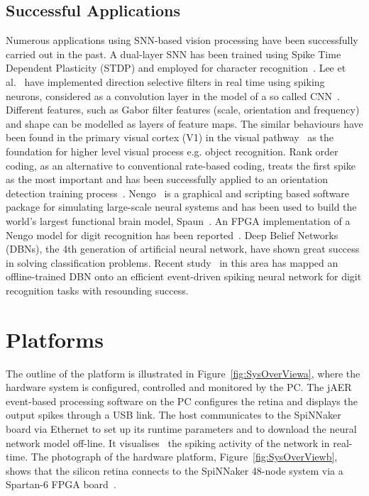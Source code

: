 \subsection{Successful Applications}
Numerous applications using SNN-based vision processing have been successfully carried out in the past. 
A dual-layer SNN has been trained using Spike Time Dependent Plasticity (STDP) and employed for character recognition~\cite{gupta2007character}. 
Lee et al.~\cite{6467270} have implemented direction selective filters in real time using spiking neurons, considered as a convolution layer in the model of a so called CNN~\cite{camunas2012event}. 
Different features, such as Gabor filter features (scale, orientation and frequency) and shape can be modelled as layers of feature maps. 
The similar behaviours have been found in the primary visual cortex (V1) in the visual pathway~\cite{rehn2007network} as the foundation for higher level visual process e.g. object recognition.
Rank order coding, as an alternative to conventional rate-based coding, treats the first spike as the most important and has been successfully applied to an orientation detection training process~\cite{delorme2001networks}. 
Nengo~\cite{eliasmith2011nengo} is a graphical and scripting based software package for simulating large-scale neural systems and has been used to build the world's largest functional brain model, Spaun~\cite{eliasmith2012large}. 
An FPGA implementation of a Nengo model for digit recognition has been reported~\cite{naylor2013managing}. 
Deep Belief Networks (DBNs), the 4th generation of artificial neural network, have shown great success in solving classification problems. 
Recent study~\cite{o2013real} in this area has mapped an offline-trained DBN onto an efficient event-driven spiking neural network for digit recognition tasks with resounding success.





\section{Platforms}
\label{sec:plt}
The outline of the platform is illustrated in Figure~\ref{fig:SysOverViewa}, where the hardware system is configured, controlled and monitored by the PC.
The jAER~\cite{delbruck2008frame} event-based processing software on the PC configures the retina and displays the output spikes through a USB link.
The host communicates to the SpiNNaker board via Ethernet to set up its runtime parameters and to download the neural network model off-line.
It visualises~\cite{6252490} the spiking activity of the network in real-time.
The photograph of the hardware platform, Figure~\ref{fig:SysOverViewb}, shows that the silicon retina connects to the SpiNNaker 48-node system via a Spartan-6 FPGA board~\cite{galluppi2012real}.



